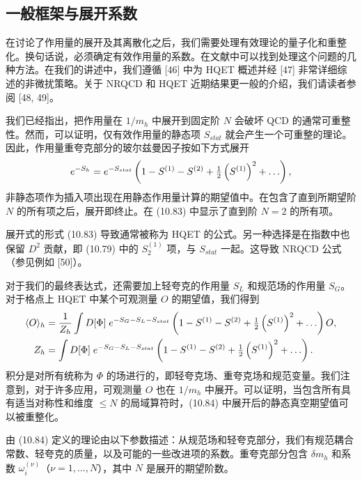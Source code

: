 \subsection{一般框架与展开系数}

在讨论了作用量的展开及其离散化之后，我们需要处理有效理论的量子化和重整化。换句话说，必须确定有效作用量的系数。在文献中可以找到处理这个问题的几种方法。在我们的讲述中，我们遵循 [46] 中为 HQET 概述并经 [47] 非常详细综述的非微扰策略。关于 NRQCD 和 HQET 近期结果更一般的介绍，我们请读者参阅 [48, 49]。

我们已经指出，把作用量在 $1/m_h$ 中展开到固定阶 $N$ 会破坏 QCD 的通常可重整性。然而，可以证明，仅有效作用量的静态项 $S_{stat}$ 就会产生一个可重整的理论。因此，作用量重夸克部分的玻尔兹曼因子按如下方式展开
\begin{equation}
  e^{-S_h} = e^{-S_{stat}}
  \left(1 - S^{(1)} - S^{(2)} + \tfrac{1}{2}\left(S^{(1)}\right)^2 + \ldots\right) ,
\end{equation}
非静态项作为插入项出现在用静态作用量计算的期望值中。在包含了直到所期望阶 $N$ 的所有项之后，展开即终止。在 (10.83) 中显示了直到阶 $N = 2$ 的所有项。

展开式的形式 (10.83) 导致通常被称为 HQET 的公式。另一种选择是在指数中也保留 $D^2$ 贡献，即 (10.79) 中的 $S_2^{(1)}$ 项，与 $S_{stat}$ 一起。这导致 NRQCD 公式（参见例如 [50]）。

对于我们的最终表达式，还需要加上轻夸克的作用量 $S_L$ 和规范场的作用量 $S_G$。对于格点上 HQET 中某个可观测量 $O$ 的期望值，我们得到
\begin{equation}
  \begin{split}
    \langle O\rangle_h &= \frac{1}{Z_h}
    \int D[\Phi]\; e^{-S_G - S_L - S_{stat}}
    \left(1 - S^{(1)} - S^{(2)}
    + \tfrac{1}{2}\left(S^{(1)}\right)^2 + \ldots\right)O , \\
    Z_h &= \int D[\Phi]\; e^{-S_G - S_L - S_{stat}}
    \left(1 - S^{(1)} - S^{(2)}
    + \tfrac{1}{2}\left(S^{(1)}\right)^2 + \ldots\right) .
  \end{split}
\end{equation}
积分是对所有统称为 $\Phi$ 的场进行的，即轻夸克场、重夸克场和规范变量。我们注意到，对于许多应用，可观测量 $O$ 也在 $1/m_h$ 中展开。可以证明，当包含所有具有适当对称性和维度 $\leq N$ 的局域算符时，(10.84) 中展开后的静态真空期望值可以被重整化。

由 (10.84) 定义的理论由以下参数描述：从规范场和轻夸克部分，我们有规范耦合常数、轻夸克的质量，以及可能的一些改进项的系数。重夸克部分包含 $\delta m_h$ 和系数 $\omega_i^{(\nu)}$（$\nu = 1, \ldots, N$），其中 $N$ 是展开的期望阶数。

